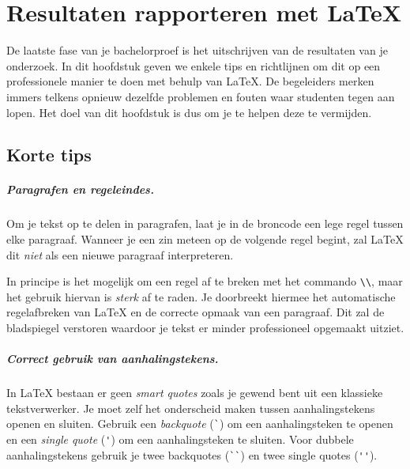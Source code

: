 \chapter{Resultaten rapporteren met {\LaTeX}}%
\label{ch:resultaten-rapporteren}

De laatste fase van je bachelorproef is het uitschrijven van de resultaten van je onderzoek. In dit hoofdstuk geven we enkele tips en richtlijnen om dit op een professionele manier te doen met behulp van {\LaTeX}. De begeleiders merken immers telkens opnieuw dezelfde problemen en fouten waar studenten tegen aan lopen. Het doel van dit hoofdstuk is dus om je te helpen deze te vermijden.

\section{Korte tips}%
\label{sec:korte-tips}

\paragraph*{Paragrafen en regeleindes.}

Om je tekst op te delen in paragrafen, laat je in de broncode een lege regel tussen elke paragraaf. Wanneer je een zin meteen op de volgende regel begint, zal {\LaTeX} dit \emph{niet} als een nieuwe paragraaf interpreteren.

In principe is het mogelijk om een regel af te breken met het commando \verb+\\+, maar het gebruik hiervan is \emph{sterk} af te raden. Je doorbreekt hiermee het automatische regelafbreken van {\LaTeX} en de correcte opmaak van een paragraaf. Dit zal de bladspiegel verstoren waardoor je tekst er minder professioneel opgemaakt uitziet.

\paragraph*{Correct gebruik van aanhalingstekens.}

In {\LaTeX} bestaan er geen \emph{smart quotes} zoals je gewend bent uit een klassieke tekstverwerker. Je moet zelf het onderscheid maken tussen aanhalingstekens openen en sluiten. Gebruik een \emph{backquote} (\verb+`+) om een aanhalingsteken te openen en een \emph{single quote} (\verb+'+) om een aanhalingsteken te sluiten. Voor dubbele aanhalingstekens gebruik je twee backquotes (\verb+``+) en twee single quotes (\verb+''+).

